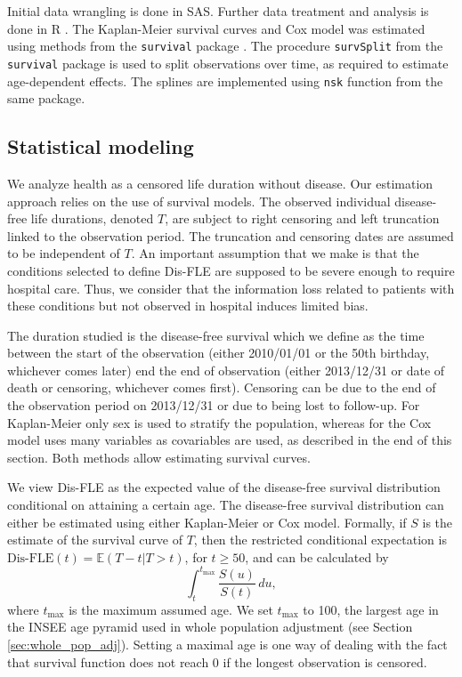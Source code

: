 \documentclass[risks,article,submit,moreauthors,pdftex]{Definitions/mdpi}
\begin{document}
Initial data wrangling is done in SAS. Further data treatment and
analysis is done in R \citep{r_core_team_r_2022}. The Kaplan-Meier
survival curves and Cox model was estimated using methods from the
\texttt{survival} package \citep{therneau_package_2023}. The procedure
\texttt{survSplit} from the \texttt{survival} package is used to split
observations over time, as required to estimate age-dependent effects.
The splines are implemented using \texttt{nsk} function from the same
package.

\hypertarget{statistical-modeling}{%
\subsection{Statistical modeling}\label{statistical-modeling}}

We analyze health as a censored life duration without disease. Our
estimation approach relies on the use of survival models. The observed
individual disease-free life durations, denoted \(T\), are subject to
right censoring and left truncation linked to the observation period.
The truncation and censoring dates are assumed to be independent of
\(T\). An important assumption that we make is that the conditions
selected to define Dis-FLE are supposed to be severe enough to require
hospital care. Thus, we consider that the information loss related to
patients with these conditions but not observed in hospital induces
limited bias.

The duration studied is the disease-free survival which we define as the
time between the start of the observation (either 2010/01/01 or the 50th
birthday, whichever comes later) end the end of observation (either
2013/12/31 or date of death or censoring, whichever comes first).
Censoring can be due to the end of the observation period on 2013/12/31
or due to being lost to follow-up. For Kaplan-Meier only sex is used to
stratify the population, whereas for the Cox model uses many variables
as covariables are used, as described in the end of this section. Both
methods allow estimating survival curves.

We view Dis-FLE as the expected value of the disease-free survival
distribution conditional on attaining a certain age. The disease-free
survival distribution can either be estimated using either Kaplan-Meier
or Cox model. Formally, if \(S\) is the estimate of the survival curve
of \(T\), then the restricted conditional expectation is
\(\text{Dis-FLE}(t) = \mathbb{E}(T-t | T > t)\), for \(t \geq 50\), and
can be calculated by \[
\int_{t}^{t_{\text{max}}} \frac{S(u)}{S(t)}\, du,
\] where \(t_{\text{max}}\) is the maximum assumed age. We set
\(t_{\text{max}}\) to 100, the largest age in the INSEE age pyramid used
in whole population adjustment (see Section \ref{sec:whole_pop_adj}).
Setting a maximal age is one way of dealing with the fact that survival
function does not reach 0 if the longest observation is censored.
\end{document}
